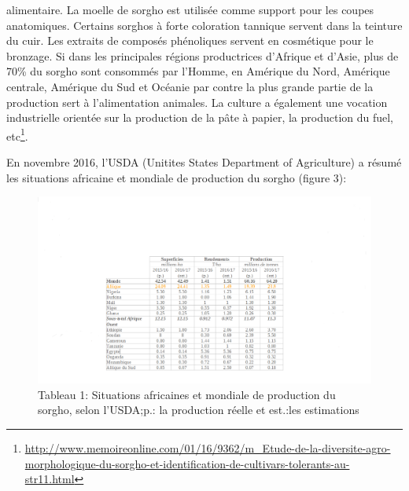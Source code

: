\documentclass[a4paper,11pt]{article}
\begin{document}
alimentaire. La moelle de sorgho est utilisée comme support pour les
coupes anatomiques. Certains sorghos à forte coloration tannique
servent dans la teinture du cuir. Les extraits de composés phénoliques
servent en cosmétique pour le bronzage. Si dans les principales
régions productrices d’Afrique et d’Asie, plus de 70\% du sorgho sont
consommés par l’Homme, en Amérique du Nord, Amérique centrale,
Amérique du Sud et Océanie par contre la plus grande partie de la
production sert à l’alimentation animales\cite{BARRO_KONDOMBO_2010}. La
culture a également une vocation industrielle orientée sur la
production de la pâte à papier, la production du fuel,
etc\footnote{\url{http://www.memoireonline.com/01/16/9362/m_Etude-de-la-diversite-agro-morphologique-du-sorgho-et-identification-de-cultivars-tolerants-au-str11.html}}.

En novembre 2016, l’USDA (Unitites States Department of Agriculture) a résumé les situations africaine et mondiale de production du sorgho (figure 3):


\begin{figure}%
  \begin{center}
   \includegraphics[width=14cm]{images/WorldSorghumStatisticsUsda}
  \end{center}
  \caption{Tableau 1: Situations africaines et mondiale de production du sorgho, selon l’USDA;p.:
    la production réelle et est.:les estimations}
\end{figure}

        
\end{document}
